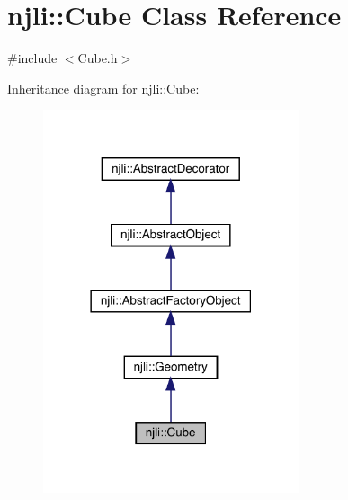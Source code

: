 \hypertarget{classnjli_1_1_cube}{}\section{njli\+:\+:Cube Class Reference}
\label{classnjli_1_1_cube}


{\ttfamily \#include $<$Cube.\+h$>$}



Inheritance diagram for njli\+:\+:Cube\+:\nopagebreak
\begin{figure}[H]
\begin{center}
\leavevmode
\includegraphics[width=213pt]{classnjli_1_1_cube__inherit__graph}
\end{center}
\end{figure}


